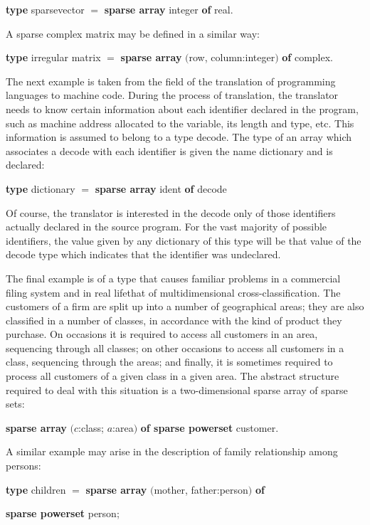 \documentclass[twoside,11pt]{book}
\begin{document}
\quad \textbf{type} sparsevector $=$ \textbf{sparse array} integer \textbf{of} real.

\noindent
A sparse complex matrix may be defined in a similar way:

\quad \textbf{type} irregular matrix $=$ \textbf{sparse array} $($row, column:integer$)$ \textbf{of} complex.

The next example is taken from the field of the translation of programming languages to machine code. During the process of translation, the translator needs to know certain information about each identifier declared in the program, such as machine address allocated to the variable, its length and type, etc. This information is assumed to belong to a type decode. The type of an array which associates a decode with each identifier is given the name dictionary and is declared:

\quad \textbf{type} dictionary $=$ \textbf{sparse array} ident \textbf{of} decode

\noindent
Of course, the translator is interested in the decode only of those identifiers actually declared in the source program. For the vast majority of possible identifiers, the value given by any dictionary of this type will be that value of the decode type which indicates that the identifier was undeclared.

The final example is of a type that causes familiar problems in a commercial filing system and in real life\textemdash{}that of multidimensional cross-classification. The customers of a firm are split up into a number of geographical areas; they are also classified in a number of classes, in accordance with the kind of product they purchase. On occasions it is required to access all customers in an area, sequencing through all classes; on other occasions to access all customers in a class, sequencing through the areas; and finally, it is sometimes required to process all customers of a given class in a given area. The abstract structure required to deal with this situation is a two-dimensional sparse array of sparse sets:

\quad \textbf{sparse array} $(c$:class; $a$:area$)$ \textbf{of sparse powerset} customer.

A similar example may arise in the description of family relationship among persons:

\quad \textbf{type} children $=$ \textbf{sparse array} $($mother, father:person$)$ \textbf{of} 

\tabto*{9.2em}\textbf{sparse powerset} person;
\end{document}
